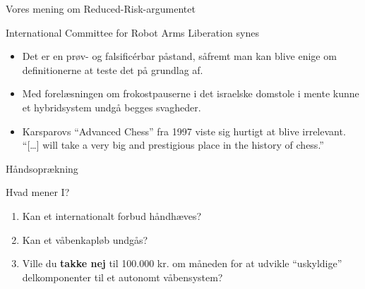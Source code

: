   \begin{frame}{Vores mening om Reduced-Risk-argumentet}


        International Committee for Robot Arms Liberation synes%

        \begin{itemize}

            \pause

            \item Det er en prøv- og falsificérbar påstand, såfremt man kan blive enige om
                definitionerne at teste det på grundlag af. 

            \pause
                
            \item Med forelæsningen om frokostpauserne i det israelske domstole i
                mente kunne et hybridsystem undgå begges
                svagheder. \citep[s. 2]{Danziger6889}

            \pause

            \item Karsparovs \enquote{Advanced Chess} fra 1997 viste sig hurtigt
                at blive irrelevant. \enquote{[\dots] will take a very big and
                prestigious place in the history of chess.} \citep{kasparov}
                \citep[s. 699, 705]{asaro}

            \end{itemize}


  \end{frame}

  \begin{frame}{Håndsoprækning} 
      
      Hvad mener I? 
     \begin{enumerate}
         \item Kan et internationalt forbud håndhæves?

            \pause

         \item Kan et våbenkapløb undgås?

            \pause

         \item Ville du \textbf{takke nej} til 100.000 kr. om måneden for at           
             udvikle \enquote{uskyldige} delkomponenter til et autonomt våbensystem?
     \end{enumerate}
     
 \end{frame}


%      
%      
